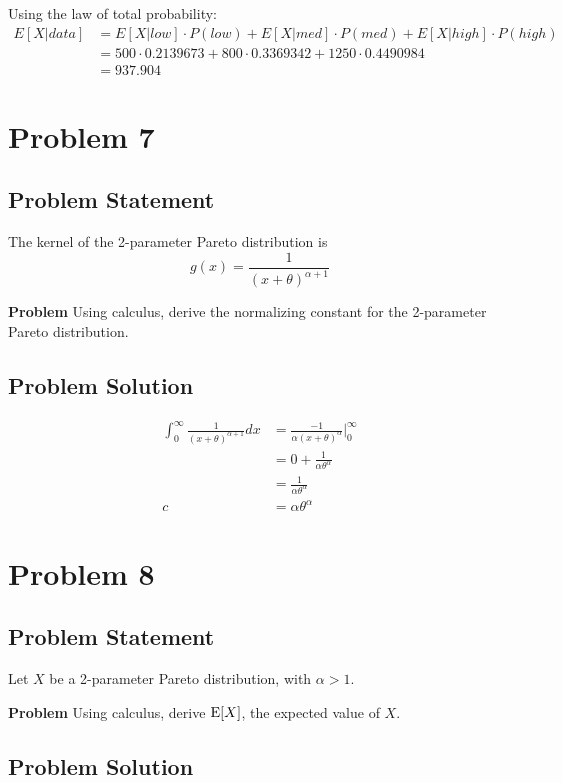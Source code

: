 \documentclass[12pt]{article}
\theoremstyle{definition}
\begin{document}
Using the law of total probability:
\begin{align*}
E[X|data] &= E[X|low] \cdot P(low) + E[X|med] \cdot P(med) + E[X|high] \cdot P(high)\\
&= 500 \cdot 0.2139673 + 800 \cdot 0.3369342 + 1250 \cdot 0.4490984\\
&= 937.904
\end{align*}


\newpage
\section*{Problem 7}

\subsection*{Problem Statement}

The kernel of the 2-parameter Pareto distribution is
$$
g(x) = \frac{1}{(x + \theta)^{\alpha + 1}}
$$

\bigskip
\noindent
{\bf Problem} Using calculus, derive the normalizing constant for the 2-parameter Pareto distribution.


\subsection*{Problem Solution}
\begin{align*}
\int_0^\infty \frac{1}{(x + \theta)^{\alpha + 1}} dx &= \frac{-1}{\alpha(x + \theta)^{\alpha}}\biggr\rvert_0^\infty\\
&= 0 + \frac{1}{\alpha\theta^{\alpha}}\\
&= \frac{1}{\alpha\theta^{\alpha}}\\
c &= \alpha \theta^\alpha
\end{align*}



\newpage
\section*{Problem 8}

\subsection*{Problem Statement}

Let $X$ be a 2-parameter Pareto distribution, with $\alpha > 1$.

\bigskip
\noindent
{\bf Problem} Using calculus, derive $\hbox{E}[X]$, the expected value of $X$.


\subsection*{Problem Solution}
\end{document}
